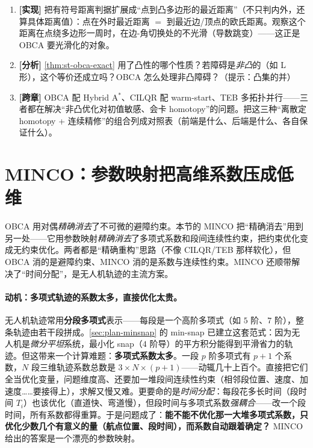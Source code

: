\begin{practice}
\begin{enumerate}
  \item \textbf{[实现]} 把有符号距离判据扩展成“点到凸多边形的最近距离”（不只判内外，还算具体距离值）：点在外时最近距离 $=$ 到最近边/顶点的欧氏距离。观察这个距离在点绕多边形一周时，在边-角切换处的不光滑（导数跳变）——这正是 OBCA 要光滑化的对象。
  \item \textbf{[分析]} \cref{thm:st-obca-exact} 用了凸性的哪个性质？若障碍是\emph{非凸}的（如 L 形），这个等价还成立吗？OBCA 怎么处理非凸障碍？（提示：凸集的并）
  \item \textbf{[跨章]} OBCA 配 Hybrid A$^*$、CILQR 配 warm-start、TEB 多拓扑并行——三者都在解决“非凸优化对初值敏感、会卡 homotopy”的问题。把这三种“离散定 homotopy + 连续精修”的组合列成对照表（前端是什么、后端是什么、各自保证什么）。
\end{enumerate}
\end{practice}

\section{MINCO：参数映射把高维系数压成低维}
\label{sec:st-minco}

\begin{note}
OBCA 用对偶\emph{精确消去}了不可微的避障约束。本节的 MINCO 把“精确消去”用到另一处——它用参数映射\emph{精确消去}了多项式系数和段间连续性约束，把约束优化变成无约束优化。两者都是“精确重构”思路（不像 CILQR/TEB 那样软化），但 OBCA 消的是避障约束、MINCO 消的是系数与连续性约束。MINCO 还顺带解决了“时间分配”，是无人机轨迹的主流方案。
\end{note}

\paragraph{动机：多项式轨迹的系数太多，直接优化太贵。}
无人机轨迹常用\textbf{分段多项式}表示——每段是一个高阶多项式（如 $5$ 阶、$7$ 阶），整条轨迹由若干段拼成。\cref{sec:plan-minsnap} 的 min-snap 已建立这套范式：因为无人机是\emph{微分平坦}系统，最小化 snap（$4$ 阶导）的平方积分能得到平滑省力的轨迹。但这带来一个计算难题：\textbf{多项式系数太多}。一段 $p$ 阶多项式有 $p+1$ 个系数，$N$ 段三维轨迹系数总数是 $3\times N\times(p+1)$——动辄几十上百个。直接把它们全当优化变量，问题维度高、还要加一堆段间连续性约束（相邻段位置、速度、加速度……要接得上），求解又慢又难。更要命的是\emph{时间分配}：每段花多长时间（段时间 $T_i$）也该优化（直道快、弯道慢），但段时间与多项式系数\emph{强耦合}——改一个段时间，所有系数都得重算。于是问题成了：\textbf{能不能不优化那一大堆多项式系数，只优化少数几个有意义的量（航点位置、段时间），而系数自动跟着确定？} MINCO 给出的答案是一个漂亮的参数映射。

